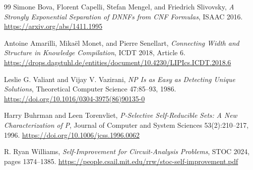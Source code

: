 \documentclass[11pt]{article}
\begin{document}
\begin{thebibliography}{99}
Simone Bova, Florent Capelli, Stefan Mengel, and Friedrich Slivovsky,
\emph{A Strongly Exponential Separation of DNNFs from CNF Formulas},
ISAAC 2016.
\url{https://arxiv.org/abs/1411.1995}

Antoine Amarilli, Mika\"el Monet, and Pierre Senellart,
\emph{Connecting Width and Structure in Knowledge Compilation},
ICDT 2018, Article 6.
\url{https://drops.dagstuhl.de/entities/document/10.4230/LIPIcs.ICDT.2018.6}

Leslie G. Valiant and Vijay V. Vazirani,
\emph{NP Is as Easy as Detecting Unique Solutions},
Theoretical Computer Science 47:85--93, 1986.
\url{https://doi.org/10.1016/0304-3975(86)90135-0}

Harry Buhrman and Leen Torenvliet,
\emph{P-Selective Self-Reducible Sets: A New Characterization of P},
Journal of Computer and System Sciences 53(2):210--217, 1996.
\url{https://doi.org/10.1006/jcss.1996.0062}

R. Ryan Williams,
\emph{Self-Improvement for Circuit-Analysis Problems},
STOC 2024, pages 1374--1385.
\url{https://people.csail.mit.edu/rrw/stoc-self-improvement.pdf}

\end{thebibliography}
\end{document}
